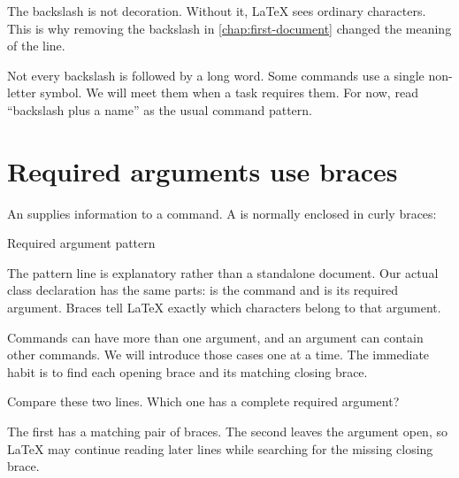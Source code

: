 
The backslash is not decoration. Without it, \LaTeX{} sees ordinary characters.
This is why removing the backslash in \cref{chap:first-document} changed the
meaning of the line.

\begin{classroomnote}
Not every backslash is followed by a long word. Some commands use a single
non-letter symbol. We will meet them when a task requires them. For now, read
``backslash plus a name'' as the usual command pattern.
\end{classroomnote}

\section{Required arguments use braces}

An  supplies information to a command. A  is normally enclosed in curly braces:

\begin{latexcode}{Required argument pattern}
\end{latexcode}

The pattern line is explanatory rather than a standalone document. Our actual
class declaration has the same parts:  is the command and
 is its required argument. Braces tell \LaTeX{} exactly which
characters belong to that argument.

Commands can have more than one argument, and an argument can contain other
commands. We will introduce those cases one at a time. The immediate habit is
to find each opening brace and its matching closing brace.

\begin{pausepredict}
Compare these two lines. Which one has a complete required argument?

\begin{latexcode}{One complete and one incomplete line}
\documentclass{article}
\documentclass{article
\end{latexcode}

The first has a matching pair of braces. The second leaves the argument open,
so \LaTeX{} may continue reading later lines while searching for the missing
closing brace.
\end{pausepredict}

